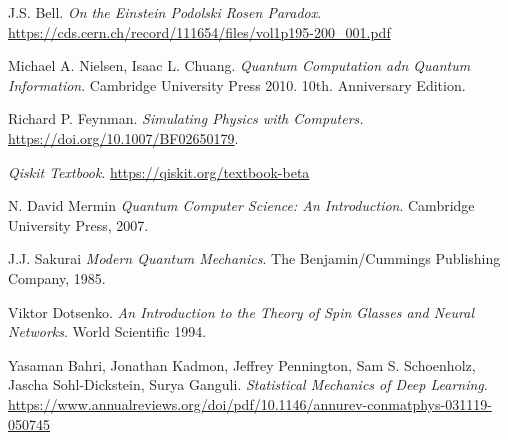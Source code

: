 \documentclass[a4paper]{article}
\begin{document}
\begin{thebibliography}{99}

 J.S. Bell. \textit{On the Einstein Podolski Rosen Paradox}. \url{https://cds.cern.ch/record/111654/files/vol1p195-200_001.pdf}

 Michael A. Nielsen, Isaac L. Chuang. \textit{Quantum Computation adn Quantum Information}. Cambridge University Press 2010. 10th. Anniversary Edition.

 Richard P. Feynman. \textit{Simulating Physics with Computers.} \url{https://doi.org/10.1007/BF02650179}.

 \textit{Qiskit Textbook}. \url{https://qiskit.org/textbook-beta}

 N. David Mermin \textit{Quantum Computer Science: An Introduction}. Cambridge University Press, 2007.

 J.J. Sakurai \textit{Modern Quantum Mechanics}. The Benjamin/Cummings Publishing Company, 1985.

 Viktor Dotsenko. \textit{An Introduction to the Theory of Spin Glasses and Neural Networks}. World Scientific 1994.

 Yasaman Bahri, Jonathan Kadmon, Jeffrey Pennington, Sam S. Schoenholz, Jascha Sohl-Dickstein, Surya Ganguli. \textit{Statistical Mechanics of Deep Learning}. \url{https://www.annualreviews.org/doi/pdf/10.1146/annurev-conmatphys-031119-050745}


\end{thebibliography}
\end{document}
